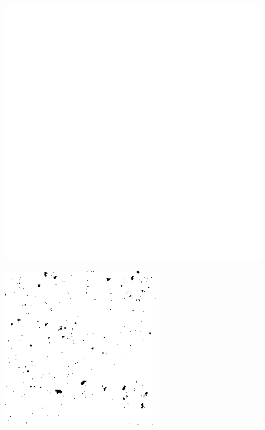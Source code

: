 \begin{figure}[H]
\vspace*{-0.5cm}
\raggedright
\begin{minipage}[h]{0.245\textwidth}
    \includegraphics[width=1\textwidth]{result/noisy/1.png}
    \label{fig:noise_ref}
\end{minipage}\linebreak
\begin{minipage}[t]{0.245\textwidth}
    \includegraphics[width = \textwidth]{result/noisy/1_5_20.png}

\end{minipage}
\end{figure}
